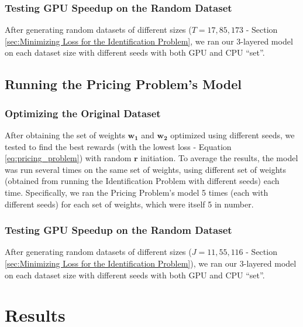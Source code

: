 \documentclass[12pt]{article}
\newcommand{\vect}[1]{\mathbf{#1}}  %
\newcommand{\matr}[1]{\mathbf{#1}}  %
\begin{document}
    \subsubsection{Testing GPU Speedup on the Random Dataset}
    After generating random datasets of different sizes ($T = 17, 85, 173$ - Section \ref{sec:Minimizing Loss for the Identification Problem}, we ran our 3-layered model on each dataset size with different seeds with both GPU and CPU ``set''.
    
    \subsection{Running the Pricing Problem's Model}
    \subsubsection{Optimizing the Original Dataset}
    After obtaining the set of weights $\matr{w_1}$ and $\matr{w_2}$ optimized using different seeds, we tested to find the best rewards (with the lowest loss - Equation \ref{eq:pricing_problem}) with random $\vect{r}$ initiation. To average the results, the model was run several times on the same set of weights, using different set of weights (obtained from running the Identification Problem with different seeds) each time. Specifically, we ran the Pricing Problem's model 5 times (each with different seeds) for each set of weights, which were itself 5 in number.
    
    \subsubsection{Testing GPU Speedup on the Random Dataset}
    After generating random datasets of different sizes ($J = 11, 55, 116$ - Section \ref{sec:Minimizing Loss for the Identification Problem}), we ran our 3-layered model on each dataset size with different seeds with both GPU and CPU ``set''.
    
    \section{Results} \label{sec:Results}
\end{document}
